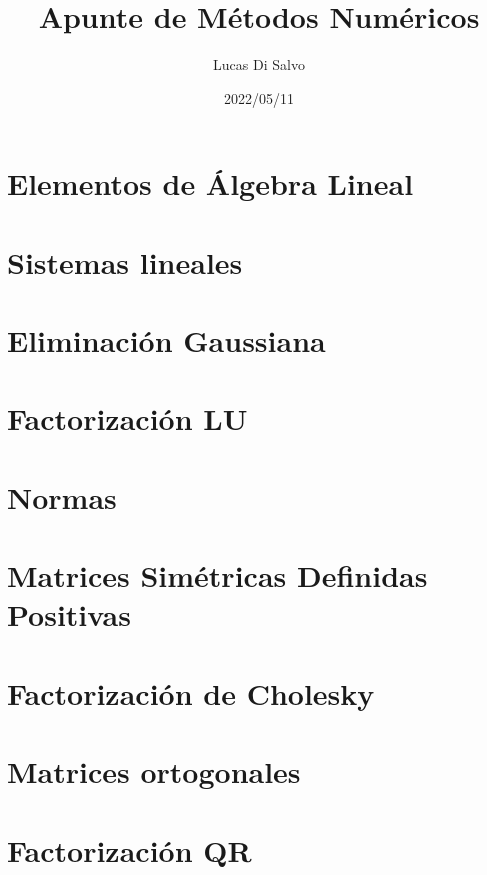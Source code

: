 \documentclass[a4paper]{article}
\title{Apunte de Métodos Numéricos}
\author{Lucas Di Salvo}
\date{2022/05/11}
\begin{document}
\maketitle

\thispagestyle{empty}
\vspace{1cm}
{
\hypersetup{linkcolor = black}
\tableofcontents
}
\newpage

\thispagestyle{empty}
\vspace{1cm}
\renewcommand*\listalgorithmname{Lista de Algoritmos}
{
\hypersetup{linkcolor = black}
\listofalgorithms}
\newpage

\section{Elementos de Álgebra Lineal}\label{section:elementos_de_algebra_lineal}

\newpage

\section{Sistemas lineales}\label{section:sistemas_lineales}

\newpage

\section{Eliminación Gaussiana}\label{section:eliminacion_gaussiana}

\newpage

\section{Factorización LU}\label{section:factorizacion_lu}

\newpage

\section{Normas}\label{section:normas}

\newpage

\section{Matrices Simétricas Definidas Positivas}\label{section:matrices_sdp}

\newpage

\section{Factorización de Cholesky}\label{section:factorizacion_de_cholesky}

\newpage

\section{Matrices ortogonales}\label{section:matrices_ortogonales}

\newpage

\section{Factorización QR}\label{section:factorizacon_qr}

\newpage
\end{document}
